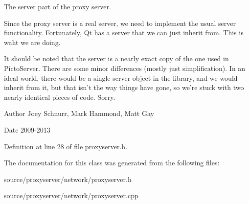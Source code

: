 The server part of the proxy server.

Since the proxy server is a real server, we need to implement the usual server functionality. Fortunately, Qt has a server that we can just inherit from. This is waht we are doing.

It should be noted that the server is a nearly exact copy of the one used in Picto\-Server. There are some minor differences (mostly just simplification). In an ideal world, there would be a single server object in the library, and we would inherit from it, but that isn't the way things have gone, so we're stuck with two nearly identical pieces of code. Sorry. \begin{DoxyAuthor}{Author}
Joey Schnurr, Mark Hammond, Matt Gay 
\end{DoxyAuthor}
\begin{DoxyDate}{Date}
2009-\/2013 
\end{DoxyDate}


Definition at line 28 of file proxyserver.\-h.



The documentation for this class was generated from the following files\-:\begin{DoxyCompactItemize}
\item 
source/proxyserver/network/proxyserver.\-h\item 
source/proxyserver/network/proxyserver.\-cpp\end{DoxyCompactItemize}
